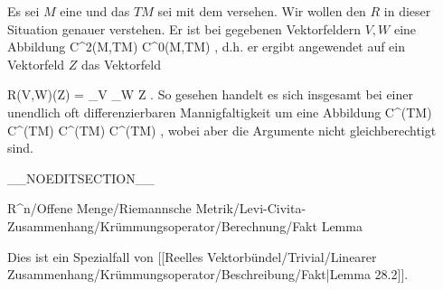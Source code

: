 \setcounter{section}{29}


Es sei $M$ eine
und das
$TM$ sei mit dem
versehen. Wir wollen den
$R$ in dieser Situation genauer verstehen. Er ist bei gegebenen Vektorfeldern $V,W$ eine Abbildung
 { C^2(M,TM) } { C^0(M,TM)
} {,}
d.h. er ergibt angewendet auf ein
 {} {}
Vektorfeld $Z$ das Vektorfeld

\mavergleichskettedisp
{\vergleichskette
{ R(V,W)(Z)
}
{ =} { \nabla_V \nabla_W Z
}
{ } {
}
{ } {
}
{ } {
}
}
{}{}{.}
So gesehen handelt es sich insgesamt bei einer unendlich oft differenzierbaren Mannigfaltigkeit um  eine Abbildung
\maabbdisp {} {C^\infty(TM) \times C^\infty(TM) \times C^\infty(TM)  } { C^\infty(TM)
} {,}
wobei aber die Argumente nicht gleichberechtigt sind.

__NOEDITSECTION__

{R^n/Offene Menge/Riemannsche Metrik/Levi-Civita-Zusammenhang/Krümmungsoperator/Berechnung/Fakt}
{Lemma}
{}
{

\faktzusatz {}
\faktzusatz {}

}
{

Dies ist ein Spezialfall von
[[Reelles Vektorbündel/Trivial/Linearer Zusammenhang/Krümmungsoperator/Beschreibung/Fakt|Lemma 28.2]].

}

